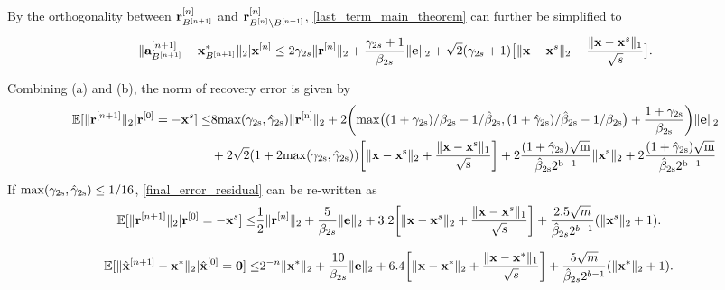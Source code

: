 \documentclass{article}
\begin{document}
By the orthogonality between ${\bf r}_{B^{[n+1]}}^{[n]}$ and ${\bf r}_{B^{[n]} \backslash B^{[n+1]}}^{[n]}$, \ref{last_term_main_theorem} can further be simplified to
\begin{equation}
    \begin{split}
        \|{{\bf a}}_{B^{[n+1]}}^{[n+1]} - {{\bf x}}_{B^{[n+1]}}^{*} \|_2 |{\bf x}^{[n]} \leq 2 \gamma_{2s} \| {\bf r}^{[n]}\|_2 + \frac{\gamma_{2s}+1}{\beta_{2s}}\| {\bf e}\|_2 + \sqrt{2}(\gamma_{2s}+1) \big [ \|{\bf x} - {\bf x}^s\|_2 - \frac{\|{\bf x} - {\bf x}^s\|_1}{\sqrt{s}}\big].
    \end{split}
\end{equation}

Combining (a) and (b), the norm of recovery error is given by
\begin{equation}\label{final_error_residual}
    \begin{split}
        \mathbb{E}[\|{\bf r}^{[n+1]}\|_2|{\bf r}^{[0]}=-{\bf x}^s] \leq &8\rm{max}(\gamma_{2s},\hat{\gamma}_{2s}) \|{\bf r}^{[n]}\|_2 
        + 2\bigg(\rm{max}\big((1+\gamma_{2s})/\beta_{2s} - 1/\hat{\beta}_{2s}, (1+\hat{\gamma}_{2s})/\hat{\beta}_{2s} - 1/{\beta}_{2s} \big)+\frac{1+\gamma_{2s}}{\beta_{2s}}\bigg)\|{\bf e} \|_2\\
        &+2\sqrt{2}(1+2\rm{max}({\gamma}_{2s}, \hat{\gamma}_{2s}))\bigg  [ \|{\bf x}-{\bf x}^s \|_2 + \frac{\|{\bf x}-{\bf x}^s \|_1}{\sqrt{s}}\bigg]+2\frac{(1+\hat{\gamma}_{2s})\sqrt{m}}{\hat{\beta}_{2s}2^{b-1}}\|{\bf x}^s \|_2 + 2\frac{(1+\hat{\gamma}_{2s})\sqrt{m}}{\hat{\beta}_{2s}2^{b-1}}
    \end{split}
\end{equation}
If $\rm{max}({\gamma_{2s}, \hat{\gamma}_{2s}})\leq 1/16$, \ref{final_error_residual} can be re-written as 
\begin{equation}
    \begin{split}
        \mathbb{E}[\|{\bf r}^{[n+1]}\|_2|{\bf r}^{[0]}=-{\bf x}^s] \leq &\frac{1}{2}\|{\bf r}^{[n]}\|_2+ \frac{5}{\beta_{2s}}\|{\bf e} \|_2 +3.2\bigg  [ \|{\bf x}-{\bf x}^s \|_2 + \frac{\|{\bf x}-{\bf x}^s \|_1}{\sqrt{s}}\bigg]+ \frac{2.5\sqrt{m}}{\hat{\beta}_{2s}2^{b-1}}(\| {\bf x}^s\|_2+1).
    \end{split}
\end{equation}

\begin{equation}
    \begin{split}
        \mathbb{E}[\|\hat{{\bf x}}^{[n+1]}-{\bf x}^*\|_2|\hat{{\bf x}}^{[0]}={\bf 0}] \leq &2^{-n}\|{\bf x}^{*}\|_2+ \frac{10}{{\beta}_{2s}}\|{\bf e} \|_2 +6.4\bigg  [ \|{\bf x}-{\bf x}^* \|_2 + \frac{\|{\bf x}-{\bf x}^* \|_1}{\sqrt{s}}\bigg] + \frac{5\sqrt{m}}{\hat{\beta}_{2s}2^{b-1}}(\| {\bf x}^*\|_2+1).
    \end{split}
\end{equation}
\end{document}
